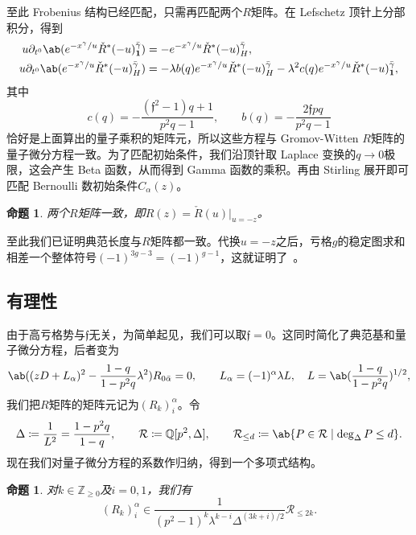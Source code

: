 \documentclass{amsart}
\newtheorem{prop}[thm]{命题}
\theoremstyle{definition}
\theoremstyle{remark}
\theoremstyle{plain}
\theoremstyle{definition}
\theoremstyle{remark}
\newcommand{\Z}{\mathbb{Z}}
\newcommand{\Q}{\mathbb{Q}}
\newcommand{\mc}[1]{\mathcal{#1}}
\newcommand{\mf}[1]{\mathfrak{#1}}
\newcommand{\1}{\mathbf{1}}
\newcommand{\2}{\mathbf{2}}
\newcommand{\3}{\mathbf{3}}
\begin{document}
至此 Frobenius 结构已经匹配，只需再匹配两个\(R\)矩阵。在 Lefschetz 顶针上分部积分，得到
\begin{align*}
    u \partial_{t^0}\ab(e^{-x^{\gamma}/u}\check{R}^*(-u)^{\bar{\gamma}}_{\1}) &= -e^{-x^{\gamma}/u}\check{R}^*(-u)^{\bar{\gamma}}_H, \\
    u\partial_{t^0}\ab(e^{-x^{\gamma}/u}\check{R}^*(-u)^{\bar{\gamma}}_H) &= -\lambda b(q)e^{-x^{\gamma}/u}\check{R}^*(-u)^{\bar{\gamma}}_H - \lambda^2 c(q) e^{-x^{\gamma}/u}\check{R}^*(-u)^{\bar{\gamma}}_{\1},
\end{align*}
其中
\[ c(q) = -\frac{(\mf{f}^2-1)q+1}{p^2q-1}, \qquad b(q) = -\frac{2\mf{f}pq}{p^2q-1} \]
恰好是上面算出的量子乘积的矩阵元，所以这些方程与 Gromov-Witten \(R\)矩阵的量子微分方程一致。为了匹配初始条件，我们沿顶针取 Laplace 变换的\(q \to 0\)极限，这会产生 Beta 函数，从而得到 Gamma 函数的乘积。再由 Stirling 展开即可匹配 Bernoulli 数初始条件\(C_{\alpha}(z)\)。

\begin{prop}%
\label{prop:R matrices coincide}
    两个\(R\)矩阵一致，即\(R(z) = \check{R}(u)|_{u=-z}\)。
\end{prop}

至此我们已证明典范长度与\(R\)矩阵都一致。代换\(u = -z\)之后，亏格\(g\)的稳定图求和相差一个整体符号\((-1)^{3g-3} = (-1)^{g-1}\)，这就证明了~。

\subsection{有理性}%
\label{sub:Rationality}

由于高亏格势与\(\mf{f}\)无关，为简单起见，我们可以取\(\mf{f} = 0\)。这同时简化了典范基和量子微分方程，后者变为
\[ \ab((zD+L_{\alpha})^2 - \frac{1-q}{1-p^2q}\lambda^2)R_{0\bar{\alpha}} = 0, \qquad L_{\alpha} = (-1)^{\alpha}\lambda L, \quad L = \ab(\frac{1-q}{1-p^2q})^{1/2}, \]
我们把\(R\)矩阵的矩阵元记为\((R_k)_i^{\alpha}\)。令
\[ \Delta \coloneqq \frac{1}{L^2} = \frac{1-p^2q}{1-q}, \qquad \mc{R} \coloneqq \Q[p^2,\Delta], \qquad \mc{R}_{\leq d} \coloneqq \ab\{P \in \mc{R} \mid \deg_{\Delta} P \leq d\}. \]
现在我们对量子微分方程的系数作归纳，得到一个多项式结构。

\begin{prop}%
\label{prop:R matrix polynomiality}
    对\(k \in \Z_{\geq0}\)及\(i = 0,1\)，我们有
    \[ (R_k)_i^{\alpha} \in \frac{1}{(p^2-1)^k \lambda^{k-i}\Delta^{(3k+i)/2}}\mc{R}_{\leq 2k}. \]
\end{prop}
\end{document}
